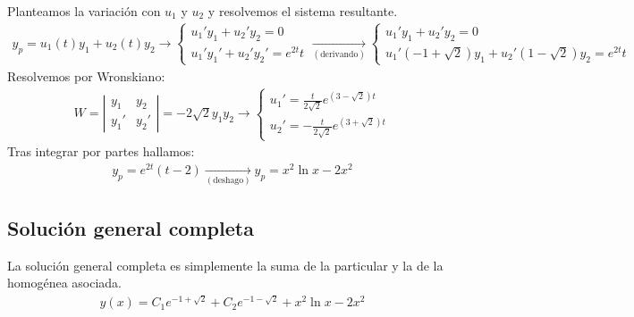 \documentclass[]{scrartcl}
\begin{document}
Planteamos la variación con $u_1$ y $u_2$ y resolvemos el sistema resultante.
\begin{gather*}
	y_p=u_1(t)y_1+u_2(t)y_2 \rightarrow \left\{
	\begin{array}{l}
		u_1'y_1+u_2'y_2=0\\
		u_1'y_1'+u_2'y_2'=e^{2t}t
	\end{array}
	\right. \xrightarrow[(\text{derivando})]{}
	\left\{
	\begin{array}{l}
		u_1'y_1+u_2'y_2=0\\
		u_1'(-1+\sqrt{2})y_1+u_2'(1-\sqrt{2})y_2=e^{2t}t
	\end{array}
	\right.
\end{gather*}
Resolvemos por Wronskiano:
\begin{gather*}
	W= \left|
	\begin{array}{cc}
		y_1&y_2\\ y_1'&y_2'
	\end{array}
	\right| =-2\sqrt{2} y_1y_2 \rightarrow
	\left\{
	\begin{array}{l}
		u_1'=\frac{t}{2\sqrt{2}}e^{(3-\sqrt{2})t}\\
		u_2'=-\frac{t}{2\sqrt{2}}e^{(3+\sqrt{2})t}
	\end{array}
	\right.
\end{gather*}
Tras integrar por partes hallamos:
\begin{gather*}
	y_p=e^{2t}(t-2)\xrightarrow[(\text{deshago})]{}\boxed{y_p=x^2\ln x -2x^2}
\end{gather*}

\subsection{Solución general completa}

La solución general completa es simplemente la suma de la particular y la de la homogénea asociada.
\begin{gather*}
	\boxed{y(x)=C_1e^{-1+\sqrt{2}}+C_2e^{-1-\sqrt{2}}+x^2\ln x -2x^2}
\end{gather*}






\end{document}
